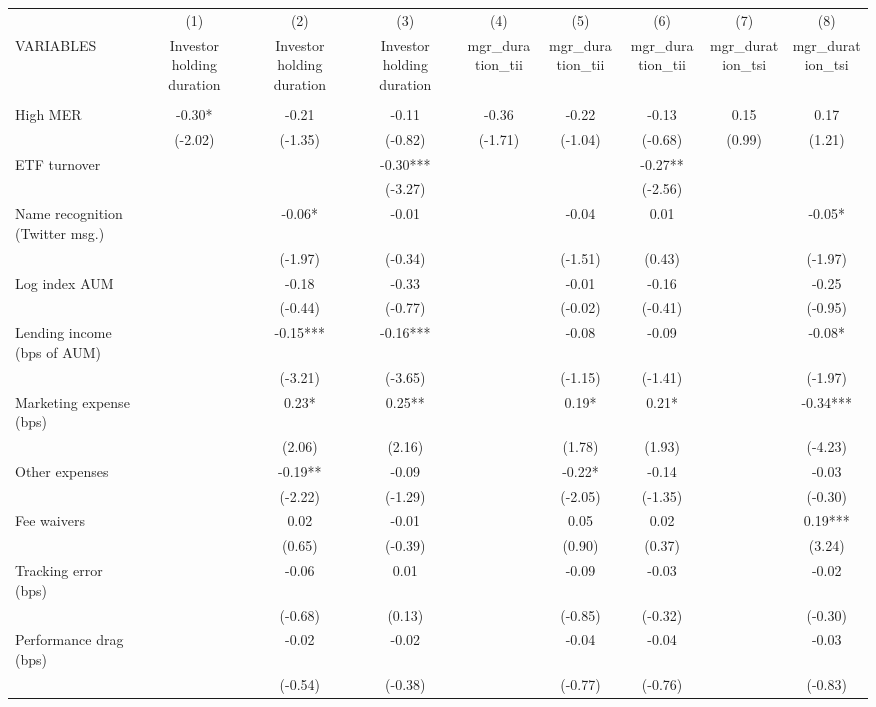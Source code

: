 \documentclass[]{article}
\begin{document}
\begin{tabular}{lcccccccc} \hline
 & (1) & (2) & (3) & (4) & (5) & (6) & (7) & (8) \\
VARIABLES & Investor holding duration & Investor holding duration & Investor holding duration & mgr\_duration\_tii & mgr\_duration\_tii & mgr\_duration\_tii & mgr\_duration\_tsi & mgr\_duration\_tsi \\ \hline
 &  &  &  &  &  &  &  &  \\
High MER & -0.30* & -0.21 & -0.11 & -0.36 & -0.22 & -0.13 & 0.15 & 0.17 \\
 & (-2.02) & (-1.35) & (-0.82) & (-1.71) & (-1.04) & (-0.68) & (0.99) & (1.21) \\
ETF turnover &  &  & -0.30*** &  &  & -0.27** &  &  \\
 &  &  & (-3.27) &  &  & (-2.56) &  &  \\
Name recognition (Twitter msg.) &  & -0.06* & -0.01 &  & -0.04 & 0.01 &  & -0.05* \\
 &  & (-1.97) & (-0.34) &  & (-1.51) & (0.43) &  & (-1.97) \\
Log index AUM &  & -0.18 & -0.33 &  & -0.01 & -0.16 &  & -0.25 \\
 &  & (-0.44) & (-0.77) &  & (-0.02) & (-0.41) &  & (-0.95) \\
Lending income (bps of AUM) &  & -0.15*** & -0.16*** &  & -0.08 & -0.09 &  & -0.08* \\
 &  & (-3.21) & (-3.65) &  & (-1.15) & (-1.41) &  & (-1.97) \\
Marketing expense (bps) &  & 0.23* & 0.25** &  & 0.19* & 0.21* &  & -0.34*** \\
 &  & (2.06) & (2.16) &  & (1.78) & (1.93) &  & (-4.23) \\
Other expenses &  & -0.19** & -0.09 &  & -0.22* & -0.14 &  & -0.03 \\
 &  & (-2.22) & (-1.29) &  & (-2.05) & (-1.35) &  & (-0.30) \\
Fee waivers &  & 0.02 & -0.01 &  & 0.05 & 0.02 &  & 0.19*** \\
 &  & (0.65) & (-0.39) &  & (0.90) & (0.37) &  & (3.24) \\
Tracking error (bps) &  & -0.06 & 0.01 &  & -0.09 & -0.03 &  & -0.02 \\
 &  & (-0.68) & (0.13) &  & (-0.85) & (-0.32) &  & (-0.30) \\
Performance drag (bps) &  & -0.02 & -0.02 &  & -0.04 & -0.04 &  & -0.03 \\
 &  & (-0.54) & (-0.38) &  & (-0.77) & (-0.76) &  & (-0.83) \\

\end{tabular}
\end{document}
